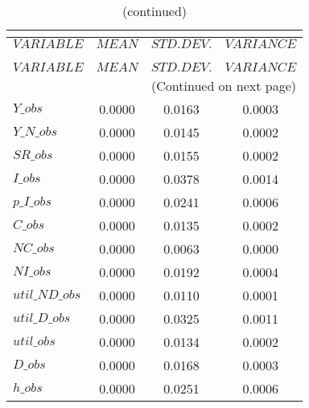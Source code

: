  
\begin{center}
\begin{longtable}{lccc} 
\caption{THEORETICAL MOMENTS}\\
 \label{Table:th_moments}\\
\toprule 
$VARIABLE       $	 & 	 $         MEAN$	 & 	 $    STD. DEV.$	 & 	 $     VARIANCE$\\
\midrule \endfirsthead 
\caption{(continued)}\\
 \toprule \\ 
$VARIABLE       $	 & 	 $         MEAN$	 & 	 $    STD. DEV.$	 & 	 $     VARIANCE$\\
\midrule \endhead 
\midrule \multicolumn{4}{r}{(Continued on next page)} \\ \bottomrule \endfoot 
\bottomrule \endlastfoot 
$Y\_obs         $	 & 	       0.0000	 & 	       0.0163	 & 	       0.0003 \\ 
$Y\_N\_obs      $	 & 	       0.0000	 & 	       0.0145	 & 	       0.0002 \\ 
$SR\_obs        $	 & 	       0.0000	 & 	       0.0155	 & 	       0.0002 \\ 
$I\_obs         $	 & 	       0.0000	 & 	       0.0378	 & 	       0.0014 \\ 
$p\_I\_obs      $	 & 	       0.0000	 & 	       0.0241	 & 	       0.0006 \\ 
$C\_obs         $	 & 	       0.0000	 & 	       0.0135	 & 	       0.0002 \\ 
$NC\_obs        $	 & 	       0.0000	 & 	       0.0063	 & 	       0.0000 \\ 
$NI\_obs        $	 & 	       0.0000	 & 	       0.0192	 & 	       0.0004 \\ 
$util\_ND\_obs  $	 & 	       0.0000	 & 	       0.0110	 & 	       0.0001 \\ 
$util\_D\_obs   $	 & 	       0.0000	 & 	       0.0325	 & 	       0.0011 \\ 
$util\_obs      $	 & 	       0.0000	 & 	       0.0134	 & 	       0.0002 \\ 
$D\_obs         $	 & 	       0.0000	 & 	       0.0168	 & 	       0.0003 \\ 
$h\_obs         $	 & 	       0.0000	 & 	       0.0251	 & 	       0.0006 \\ 
\end{longtable}
 \end{center}
